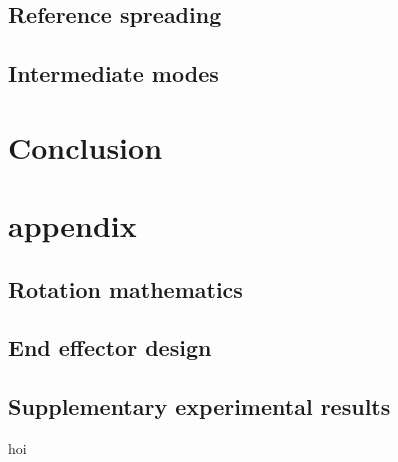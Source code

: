 \documentclass[a4paper, 10pt, conference]{ieeeconf}
\begin{document}
    \subsection{Reference spreading}
    \subsection{Intermediate modes}

    \section{Conclusion}
    
\clearpage
\section*{appendix}
\subsection{Rotation mathematics}
\subsection{End effector design}
\subsection{Supplementary experimental results}
hoi
\end{document}
